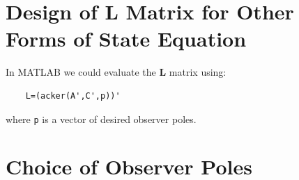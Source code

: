 \begin{slide}
\begin{center}
\end{center}
\end{slide}




\section*{Design of $\mathbf{L}$ Matrix for Other Forms of State Equation} %
\label{sec:design_of_l_matrix_for_other_forms_of_state_equation}



\ifslidesonly
\begin{slide}
   
\end{slide}
\fi

In MATLAB we could evaluate the $\mathbf{L}$ matrix using:
\begin{verbatim}
	L=(acker(A',C',p))'
\end{verbatim}  where  \verb|p|  is a vector of desired observer poles.
 



 
\section*{Choice of Observer Poles} %
\label{sec:choice_of_observer_poles}


